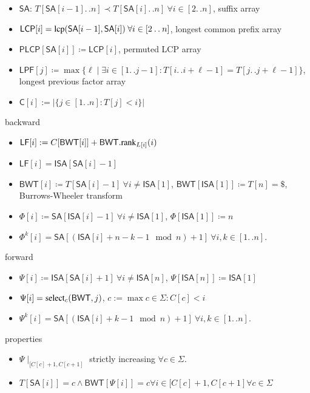\documentclass[10pt,landscape]{article}
\newcommand*{\EndZeichen}{\texttt{\$}}
\newcommand*{\IC}{\mathbin{{.}\,{.}}} %
\newcommand*{\abs}[1]{\ensuremath{|#1|}} %
\newcommand*{\menge}[1]{\ensuremath{\{#1\}}} %
\newcommand*{\instancename}[1]{\ensuremath{\mathsf{#1}}} %
\newcommand*{\LPF} {\instancename{LPF}}
\newcommand*{\LCPA} {\instancename{LCP}}
\newcommand*{\PLCP}{\instancename{PLCP}}
\newcommand*{\ISA} {\instancename{ISA}}
\newcommand*{\SA}  {\instancename{SA}}
\newcommand*{\LF}  {\instancename{LF}}
\newcommand*{\BWT}  {\instancename{BWT}}
\newcommand*{\arrC}  {\instancename{C}}
\newcommand*{\textT}  {\ensuremath{T}}
\newcommand*{\functionname}[1]{{\ensuremath{\renewcommand{\rmdefault}{ptm}\fontfamily{ppl}\selectfont\textrm{\textup{#1}}}}} %
\newcommand*{\select}{\functionname{select}}
\newcommand*{\rank}{\functionname{rank}}
\newcommand*{\lcp}{\functionname{lcp}}
\begin{document}
\begin{multicols}{2}
\begin{itemize}
	\item $\SA$: $\textT[\SA[i-1]\IC{}n] \prec \textT[\SA[i]\IC{}n]~\forall i \in [2\IC{}n]$, suffix array~\cite{manber93sa}
	\item $\LCPA[i] = \lcp(\SA[i-1], \SA[i])~\forall i \in [2\IC{}n]$, longest common prefix array
	\item $\PLCP[ {\SA[i]} ] \coloneqq \LCPA[i]$, permuted LCP array~\cite{kasai01lcp}
	\item $\LPF[j] \coloneqq \max\{\ell \mid \exists i \in [1\IC{}j-1] : \textT[i\IC{}i+\ell-1] = \textT[j\IC{}j+\ell-1]\}$, longest previous factor array~\cite{franek03lpf,crochemore08lpf}
	\item   $\arrC[i] := \abs{\menge{j \in [1\IC{}n] : \textT[j] < i}}$
\end{itemize}
backward
\begin{itemize}
   \item $\LF[i] := C[\BWT[i]] + \BWT.\rank_{L[i]}(i)$
   \item $\LF[i] = \ISA[\SA[i] - 1]$~\cite{ferragina05index}
	\item $\BWT[i] \coloneqq \textT[\SA[i]-1]~\forall i \not= \ISA[1]$, $\BWT[\ISA[1]] \coloneqq \textT[n] = \EndZeichen$, Burrows-Wheeler transform~\cite{burrows94bwt}
	\item $\Phi[i] \coloneqq \SA[ {\ISA[i]} - 1]~\forall i \not= \ISA[1]$, $\Phi[\ISA[1]] \coloneqq n$~\cite{karkkainen09plcp}
	\item $\Phi^{k}[i] = \SA[ ({\ISA[i]} + n - k-1 \mod n) + 1]~\forall i,k \in [1\IC{}n]$.
\end{itemize}
forward
\begin{itemize}
	\item $\Psi[i] \coloneqq \ISA[ {\SA[i]} + 1 ]~\forall i \not= \ISA[n]$, $\Psi[\ISA[n]] \coloneqq \ISA[1]$
	\item $\Psi[i] = \select_c(\BWT, j)$, $c := \max {c \in \Sigma : C[c] < i}$~\cite{grossi05csa}
	\item $\Psi^{k}[i] = \SA[ ({\ISA[i]} + k-1 \mod n) + 1]~\forall i,k \in [1\IC{}n]$.
\end{itemize}
properties
\begin{itemize}
	\item    $\Psi \mid_{[C[c]+1,C[c+1]}$ strictly increasing $\forall c \in \Sigma$.
	\item    $T[\SA[i]] = c \wedge \BWT[\Psi[i]] = c \forall i \in [C[c]+1,C[c+1] \forall c \in \Sigma$
\end{itemize}



\end{multicols}
\end{document}
